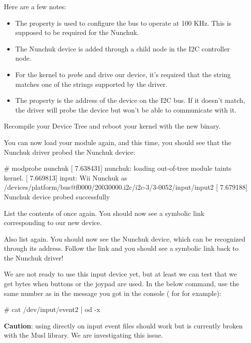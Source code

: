 Here are a few notes:
\begin{itemize}
\item The  property is used to configure the bus
      to operate at 100 KHz. This is supposed to be required for the
      Nunchuk.
\item The Nunchuk device is added through a child node in the I2C
      controller node.
\item For the kernel to {\em probe} and drive our device, it's required
      that the  string matches one of the
       strings supported by the driver.
\item The  property is the address of the device on the
      I2C bus. If it doesn't match, the driver will probe the device
      but won't be able to communicate with it.
\end{itemize}

Recompile your Device Tree and reboot your kernel with the new binary.

You can now load your module again, and this time, you should see that
the Nunchuk driver probed the Nunchuk device:

\begin{bashinput}
# modprobe nunchuk
[    7.638431] nunchuk: loading out-of-tree module taints kernel.
[    7.669813] input: Wii Nunchuk as /devices/platform/bus@f0000/20030000.i2c/i2c-3/3-0052/input/input2
[    7.679188] Nunchuk device probed successfully
\end{bashinput}

List the contents of  once again. You
should now see a symbolic link corresponding to our new device.

Also list  again. You should now see the
Nunchuk device, which can be recognized through its  address.
Follow the link and you should see a symbolic link back to the Nunchuk
driver!

We are not ready to use this input device yet, but at least we can test
that we get bytes when buttons or the joypad are used. In the below
command, use the same number as in the message you got in the console
( for  for example):

\begin{bashinput}
# cat /dev/input/event2 | od -x
\end{bashinput}

{\bf Caution}: using  directly on input event files should
work but is currently broken with the Musl library. We are investigating
this issue.

